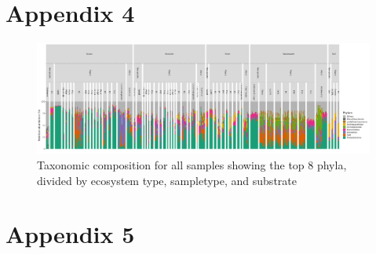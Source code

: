 \chapter{Appendix 4}
\label{appendix:tax}
\begin{figure}[h]
    \centering
    \includegraphics[width = 1.05\textheight, angle = 90]{figure/tax_phylum_ecosystem_sampletype_substrate.png}
    \caption{Taxonomic composition for all samples showing the top 8 phyla, divided by ecosystem type, sampletype, and substrate}
    \label{tax_plot_substrate_flip}
\end{figure}


\chapter{Appendix 5}
\label{appendix:code}


